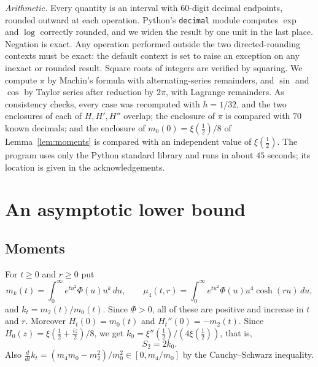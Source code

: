 \documentclass[11pt]{article}
\numberwithin{equation}{section}
\theoremstyle{definition}
\theoremstyle{remark}
\newcommand{\dd}{\,d}
\begin{document}
\medskip\noindent\emph{Arithmetic.} Every quantity is an interval with $60$-digit
decimal endpoints, rounded outward at each operation. Python's
\texttt{decimal} module computes $\exp$ and $\log$ correctly rounded, and
we widen the result by one unit in the last place. Negation is exact. Any
operation performed outside the two directed-rounding contexts must be
exact: the default context is set to raise an exception on any inexact or
rounded result. Square roots of integers are verified by squaring. We
compute $\pi$ by Machin's formula with alternating-series remainders, and
$\sin$ and $\cos$ by Taylor series after reduction by $2\pi$, with Lagrange
remainders. As consistency checks, every case was recomputed with $h=1/32$,
and the two enclosures of each of $H,H',H''$ overlap; the enclosure of $\pi$
is compared with $70$ known decimals; and the enclosure of
$m_0(0)=\xi(\tfrac12)/8$ of Lemma~\ref{lem:moments} is compared with an
independent value of $\xi(\tfrac12)$. The program uses only the Python
standard library and runs in about $45$ seconds; its location is given in
the acknowledgements.

\section{An asymptotic lower bound}\label{sec:asymptotic}

\subsection{Moments}
For $t\ge0$ and $r\ge0$ put
\begin{equation}\label{eq:moments}
m_k(t)=\int_0^\infty e^{tu^2}\Phi(u)u^k\dd u,\qquad
\mu_4(t,r)=\int_0^\infty e^{tu^2}\Phi(u)u^4\cosh(ru)\dd u,
\end{equation}
and $k_t=m_2(t)/m_0(t)$. Since $\Phi>0$, all of these are positive and
increase in $t$ and $r$. Moreover $H_t(0)=m_0(t)$ and $H_t''(0)=-m_2(t)$.
Since $H_0(z)=\xi(\tfrac12+\tfrac{iz}2)/8$, we get $k_0=\xi''(\tfrac12)/(4\xi(\tfrac12))$, that
is,
\begin{equation}\label{eq:S2k0}
S_2=2k_0 .
\end{equation}
Also $\tfrac{d}{dt}k_t=(m_4m_0-m_2^2)/m_0^2\in[0,m_4/m_0]$ by the
Cauchy--Schwarz inequality.
\end{document}
